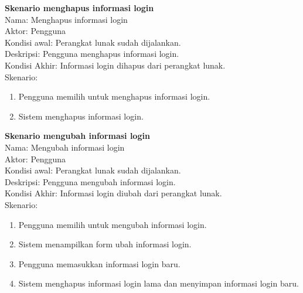 \documentclass[a4paper,twoside]{article}
\begin{document}
\begin{enumerate}
        \textbf{Skenario menghapus informasi login}\\
        Nama: Menghapus informasi login\\
        Aktor: Pengguna\\
        Kondisi awal: Perangkat lunak sudah dijalankan.\\
        Deskripsi: Pengguna menghapus informasi login.\\
        Kondisi Akhir: Informasi login dihapus dari perangkat lunak.\\
        Skenario:
        \begin{enumerate}
            \item{Pengguna memilih untuk menghapus informasi login.}
            \item{Sistem menghapus informasi login.}
        \end{enumerate}

        \textbf{Skenario mengubah informasi login}\\
        Nama: Mengubah informasi login\\
        Aktor: Pengguna\\
        Kondisi awal: Perangkat lunak sudah dijalankan.\\
        Deskripsi: Pengguna mengubah informasi login.\\
        Kondisi Akhir: Informasi login diubah dari perangkat lunak.\\
        Skenario:
        \begin{enumerate}
            \item{Pengguna memilih untuk mengubah informasi login.}
            \item{Sistem menampilkan form ubah informasi login.}
            \item{Pengguna memasukkan informasi login baru.}
            \item{Sistem menghapus informasi login lama dan menyimpan informasi login baru.}
        \end{enumerate}


\end{enumerate}
\end{document}
